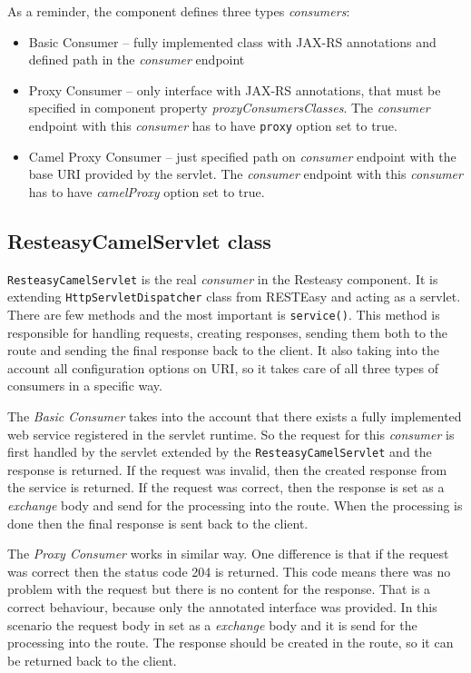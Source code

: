 \documentclass[12pt,final,oneside]{fithesis2}
\begin{document}
As a reminder, the component defines three types \textit{consumers}:
\begin{itemize}
\item
Basic Consumer  -- fully implemented class with JAX-RS annotations and defined path in the \textit{consumer} endpoint

\item
Proxy Consumer -- only interface with JAX-RS annotations, that must be specified in component property \textit{proxyConsumersClass\-es}. The \textit{consumer} endpoint with this \textit{consumer} has to have \texttt{proxy} option set to true. 

\item
Camel Proxy Consumer -- just specified path on \textit{consumer} endpoint with the base URI provided by the servlet. The \textit{consumer} endpoint with this \textit{consumer} has to have \textit{camelProxy} option set to true. 
\end{itemize}


\subsection{ResteasyCamelServlet class}\label{servlet}
\texttt{ResteasyCamelServlet} is the real \textit{consumer} in the Resteasy component. It is extending \texttt{HttpServletDispatcher} class from RESTEasy and acting as a servlet. There are few methods and the most important is \texttt{service()}. This method is responsible for handling requests, creating responses, sending them both to the route and sending the final response back to the client. It also taking into the account all configuration options on URI, so it takes care of all three types of consumers in a specific way. 

The \textit{Basic Consumer} takes into the account that there exists a fully implemented web service registered in the servlet runtime. So the request for this \textit{consumer} is first handled by the servlet extended by the \texttt{ResteasyCamelServlet} and the response is returned. If the request was invalid, then the created response from the service is returned. If the request was correct, then the response is set as a \textit{exchange} body and send for the processing into the route. When the processing is done then the final response is sent back to the client. 

The \textit{Proxy Consumer} works in similar way. One difference is that if the request was correct then the status code 204 is returned. This code means there was no problem with the request but there is no content for the response\cite{http}. That is a correct behaviour, because only the annotated interface was provided. In this scenario the request body in set as a \textit{exchange} body and it is send for the processing into the route. The response should be created in the route, so it can be returned back to the client.
\end{document}
